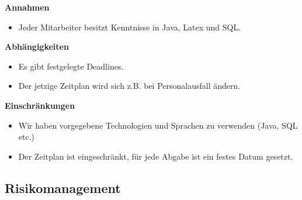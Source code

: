 \textbf{Annahmen}
\begin{itemize}
 \item Jeder Mitarbeiter besitzt Kenntnisse in Java, Latex und SQL.
\end{itemize}

\textbf{Abhängigkeiten}
\begin{itemize}
 \item Es gibt festgelegte Deadlines.
 \item Der jetzige Zeitplan wird sich z.B. bei Personalausfall ändern.
\end{itemize}

\textbf{Einschränkungen}
\begin{itemize}
 \item Wir haben vorgegebene Technologien und Sprachen zu verwenden (Java, SQL etc.) 
 \item Der Zeitplan ist eingeschränkt, für jede Abgabe ist ein festes Datum gesetzt.

\end{itemize}

\subsection{Risikomanagement}\label{riskmanagement}
